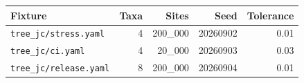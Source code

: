 \begin{tabular}{lrrrr}
  \toprule
  Fixture & Taxa & Sites & Seed & Tolerance \\
  \midrule
  \texttt{tree\_jc/stress.yaml} & 4 & 200\_000 & 20260902 & 0.01 \\
  \texttt{tree\_jc/ci.yaml} & 4 & 20\_000 & 20260903 & 0.03 \\
  \texttt{tree\_jc/release.yaml} & 8 & 200\_000 & 20260904 & 0.01 \\
  \bottomrule
\end{tabular}
